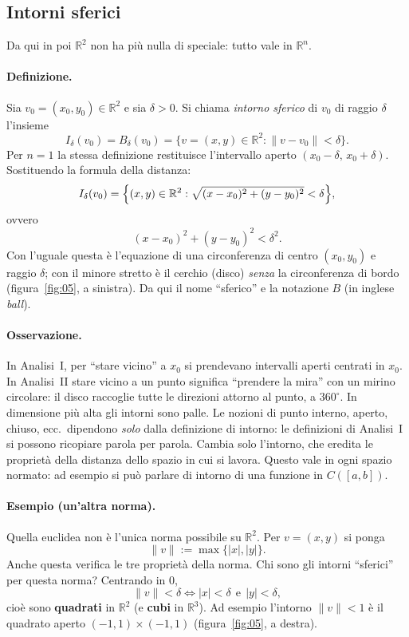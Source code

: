 \subsection{Intorni sferici}

Da qui in poi $\mathbb{R}^2$ non ha più nulla di speciale: tutto vale in $\mathbb{R}^n$.

\paragraph{Definizione.} Sia $v_0=(x_0,y_0)\in\mathbb{R}^2$ e sia $\delta>0$. Si chiama \emph{intorno sferico} di $v_0$ di raggio $\delta$ l'insieme
\[
  I_\delta(v_0)=B_\delta(v_0)=\bigl\{v=(x,y)\in\mathbb{R}^2 : \|v-v_0\|<\delta\bigr\}.
\]
Per $n=1$ la stessa definizione restituisce l'intervallo aperto $(x_0-\delta,\,x_0+\delta)$.
Sostituendo la formula della distanza:
\[
  I_\delta(v_0)=\Bigl\{(x,y)\in\mathbb{R}^2 : \sqrt{(x-x_0)^2+(y-y_0)^2}<\delta\Bigr\},
\]
ovvero
\[
  (x-x_0)^2+(y-y_0)^2<\delta^2 .
\]
Con l'uguale questa è l'equazione di una circonferenza di centro $(x_0,y_0)$ e raggio $\delta$; con il minore stretto è il cerchio (disco) \emph{senza} la circonferenza di bordo (figura~\ref{fig:05}, a sinistra). Da qui il nome ``sferico'' e la notazione $B$ (in inglese \emph{ball}).

\paragraph{Osservazione.} In Analisi~I, per ``stare vicino'' a $x_0$ si prendevano intervalli aperti centrati in $x_0$. In Analisi~II stare vicino a un punto significa ``prendere la mira'' con un mirino circolare: il disco raccoglie tutte le direzioni attorno al punto, a $360^\circ$. In dimensione più alta gli intorni sono palle.
Le nozioni di punto interno, aperto, chiuso, ecc.\ dipendono \emph{solo} dalla definizione di intorno: le definizioni di Analisi~I si possono ricopiare parola per parola. Cambia solo l'intorno, che eredita le proprietà della distanza dello spazio in cui si lavora.
Questo vale in ogni spazio normato: ad esempio si può parlare di intorno di una funzione in $C([a,b])$.

\paragraph{Esempio (un'altra norma).} Quella euclidea non è l'unica norma possibile su $\mathbb{R}^2$. Per $v=(x,y)$ si ponga
\[
  \|v\|:=\max\{|x|,|y|\}.
\]
Anche questa verifica le tre proprietà della norma. Chi sono gli intorni ``sferici'' per questa norma? Centrando in $0$,
\[
  \|v\|<\delta \iff |x|<\delta\ \ \text{e}\ \ |y|<\delta ,
\]
cioè sono \textbf{quadrati} in $\mathbb{R}^2$ (e \textbf{cubi} in $\mathbb{R}^3$). Ad esempio l'intorno $\|v\|<1$ è il quadrato aperto $(-1,1)\times(-1,1)$ (figura~\ref{fig:05}, a destra).

